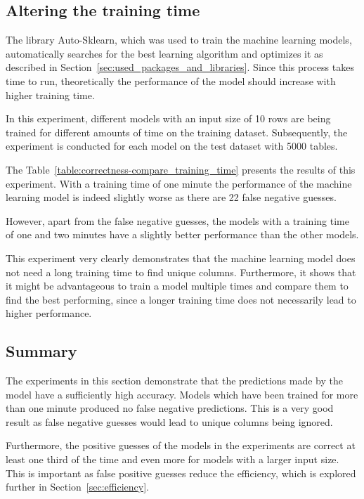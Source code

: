 


\subsection{Altering the training time}\label{subsec:correctness_comparing-training-time}
The library Auto-Sklearn, which was used to train the machine learning models, automatically searches for the best learning algorithm and optimizes it as described in Section~\ref{sec:used_packages_and_libraries}. Since this process takes time to run, theoretically the performance of the model should increase with higher training time.

In this experiment, different models with an input size of \num{10} rows are being trained for different amounts of time on the training dataset. Subsequently, the experiment is conducted for each model on the test dataset with \num{5000} tables.

The Table~\ref{table:correctness-compare_training_time} presents the results of this experiment. With a training time of one minute the performance of the machine learning model is indeed slightly worse as there are \num{22} false negative guesses.

However, apart from the false negative guesses, the models with a training time of one and two minutes have a slightly better performance than the other models.

This experiment very clearly demonstrates that the machine learning model does not need a long training time to find unique columns. Furthermore, it shows that it might be advantageous to train a model multiple times and compare them to find the best performing, since a longer training time does not necessarily lead to higher performance.




\subsection{Summary}\label{subsec:correctness_conclusions}
The experiments in this section demonstrate that the predictions made by the model have a sufficiently high accuracy. Models which have been trained for more than one minute produced no false negative predictions. This is a very good result as false negative guesses would lead to unique columns being ignored.

Furthermore, the positive guesses of the models in the experiments are correct at least one third of the time and even more for models with a larger input size. This is important as false positive guesses reduce the efficiency, which is explored further in Section~\ref{sec:efficiency}.

